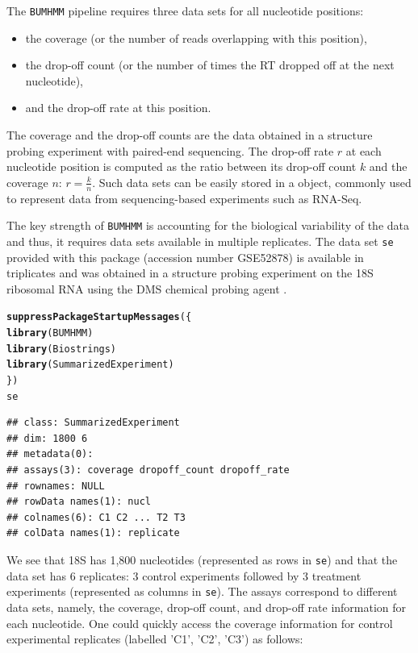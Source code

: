 \documentclass{article}\usepackage[]{graphicx}\usepackage[usenames,dvipsnames]{color}
\makeatletter
\newcommand{\hlstd}[1]{\textcolor[rgb]{0.345,0.345,0.345}{#1}}%
\newcommand{\hlkwd}[1]{\textcolor[rgb]{0.737,0.353,0.396}{\textbf{#1}}}%
\newenvironment{kframe}{%
 \def\at@end@of@kframe{}%
 \ifinner\ifhmode%
  \def\at@end@of@kframe{\end{minipage}}%
  \begin{minipage}{\columnwidth}%
 \fi\fi%
 \def\FrameCommand##1{\hskip\@totalleftmargin \hskip-\fboxsep
 \colorbox{shadecolor}{##1}\hskip-\fboxsep
     \hskip-\linewidth \hskip-\@totalleftmargin \hskip\columnwidth}%
 \MakeFramed {\advance\hsize-\width
   \@totalleftmargin\z@ \linewidth\hsize
   \@setminipage}}%
 {\par\unskip\endMakeFramed%
 \at@end@of@kframe}
\newenvironment{knitrout}{}{} %
\makeatother
\begin{document}
The \verb|BUMHMM| pipeline requires three data sets for all nucleotide
positions:

\begin{itemize}
\item the coverage (or the number of reads overlapping with this position),
\item the drop-off count (or the number of times the RT dropped off at the next
    nucleotide),
\item and the drop-off rate at this position.
\end{itemize}

The coverage and the drop-off counts are the data obtained in a structure
probing experiment with paired-end sequencing. The drop-off rate $r$ at each
nucleotide position is computed as the ratio between its drop-off count $k$ and
the coverage $n$: \(r = \frac{k}{n} \). Such data sets can be easily stored in a
 object, commonly used to represent data from
sequencing-based experiments such as RNA-Seq.

The key strength of \verb|BUMHMM| is accounting for the biological
variability of the data and thus, it requires data sets available in multiple
replicates. The data set \texttt{se} provided with this package (accession
number GSE52878) is available in triplicates and was obtained in a structure
probing experiment on the 18S ribosomal RNA using the DMS chemical probing agent
\cite{wells200032}.

\begin{knitrout}
\color{fgcolor}\begin{kframe}
\begin{alltt}
\hlkwd{suppressPackageStartupMessages}\hlstd{(\{}
    \hlkwd{library}\hlstd{(BUMHMM)}
    \hlkwd{library}\hlstd{(Biostrings)}
    \hlkwd{library}\hlstd{(SummarizedExperiment)}
\hlstd{\})}
\hlstd{se}
\end{alltt}
\begin{verbatim}
## class: SummarizedExperiment 
## dim: 1800 6 
## metadata(0):
## assays(3): coverage dropoff_count dropoff_rate
## rownames: NULL
## rowData names(1): nucl
## colnames(6): C1 C2 ... T2 T3
## colData names(1): replicate
\end{verbatim}
\end{kframe}
\end{knitrout}

We see that 18S has 1,800 nucleotides (represented as rows in \texttt{se}) and
that the data set has 6 replicates: 3 control experiments followed by 3
treatment experiments (represented as columns in \texttt{se}). The assays
correspond to different data sets, namely, the coverage, drop-off count, and
drop-off rate information for each nucleotide. One could quickly access the
coverage information for control experimental replicates (labelled 'C1', 'C2',
'C3') as follows:
\end{document}
